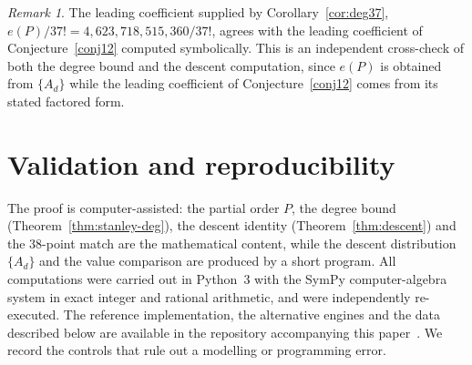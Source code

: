 \documentclass[11pt]{article}
\theoremstyle{plain}
\theoremstyle{definition}
\theoremstyle{remark}
\newtheorem{remark}[theorem]{Remark}
\begin{document}
\begin{remark}\label{rem:leadcoef}
The leading coefficient supplied by Corollary~\ref{cor:deg37},
$e(P)/37!=4{,}623{,}718{,}515{,}360/37!$, agrees with the leading coefficient of
Conjecture~\ref{conj12} computed symbolically. This is an independent cross-check of both the
degree bound and the descent computation, since $e(P)$ is obtained from $\{A_d\}$ while the
leading coefficient of Conjecture~\ref{conj12} comes from its stated factored form.
\end{remark}

\section{Validation and reproducibility}\label{sec:repro}

The proof is computer-assisted: the partial order $P$, the degree bound (Theorem~\ref{thm:stanley-deg}),
the descent identity (Theorem~\ref{thm:descent}) and the $38$-point match are the mathematical
content, while the descent distribution $\{A_d\}$ and the value comparison are produced by a
short program. All computations were carried out in Python~3 with the SymPy computer-algebra
system in exact integer and rational arithmetic, and were independently re-executed. The
reference implementation, the alternative engines and the data described below are available in
the repository accompanying this paper~\cite{REPO}. We record the controls that rule out a
modelling or programming error.
\end{document}

